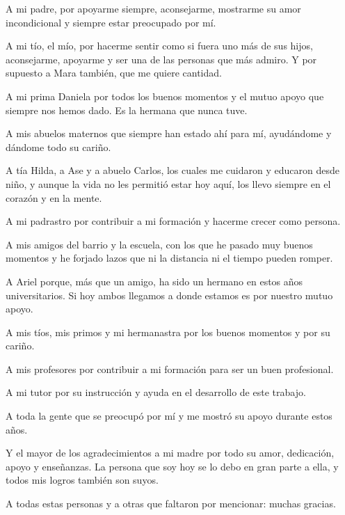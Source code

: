 \begin{acknowledgements}
    A mi padre, por apoyarme siempre, aconsejarme, mostrarme su amor incondicional y siempre estar preocupado por m\'i.
    
    A mi t\'io, el m\'io, por hacerme sentir como si fuera uno m\'as de sus hijos, aconsejarme, apoyarme y ser una de las personas que m\'as admiro. Y por supuesto a Mara tambi\'en, que me quiere cantidad.
    
    A mi prima Daniela por todos los buenos momentos y el mutuo apoyo que siempre nos hemos dado. Es la hermana que nunca tuve.
    
    A mis abuelos maternos que siempre han estado ah\'i para m\'i, ayud\'andome y d\'andome todo su cari\~no.
    
    A t\'ia Hilda, a Ase y a abuelo Carlos, los cuales me cuidaron y educaron desde ni\~no, y aunque la vida no les permiti\'o estar hoy aqu\'i, los llevo siempre en el coraz\'on y en la mente.
    
    A mi padrastro por contribuir a mi formaci\'on y hacerme crecer como persona.
    
    A mis amigos del barrio y la escuela, con los que he pasado muy buenos momentos y he forjado lazos que ni la distancia ni el tiempo pueden romper.
    
    A Ariel porque, m\'as que un amigo, ha sido un hermano en estos a\~nos universitarios. Si hoy ambos llegamos a donde estamos es por nuestro mutuo apoyo.
    
    A mis t\'ios, mis primos y mi hermanastra por los buenos momentos y por su cari\~no.
    
    A mis profesores por contribuir a mi formaci\'on para ser un buen profesional.
    
    A mi tutor por su instrucci\'on y ayuda en el desarrollo de este trabajo.
    
    A toda la gente que se preocup\'o por m\'i y me mostr\'o su apoyo durante estos a\~nos.
    
    Y el mayor de los agradecimientos a mi madre por todo su amor, dedicaci\'on, apoyo y ense\~nanzas. La persona que soy hoy se lo debo en gran parte a ella, y todos mis logros tambi\'en son suyos.
    
    A todas estas personas y a otras que faltaron por mencionar: muchas gracias.   
\end{acknowledgements}